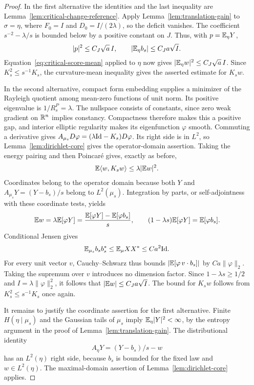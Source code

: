 \begin{proof}
In the first alternative the identities and the last inequality
are Lemma~\ref{lem:critical-change-reference}. Apply
Lemma~\ref{lem:translation-gain} to $\sigma=\eta$, where
$F_0=I$ and $D_0=I/(2\lambda)$, so the deficit vanishes.
The coefficient $s^{-2}-\lambda/s$ is bounded below by a
positive constant on $J$. Thus, with $p=\mathbb E_\eta Y$,
\[
 |p|^2\le C_J\sqrt a\,I,
 \qquad |\mathbb E_\eta b_s|\le C_Ja\sqrt I.
\]
Equation~\eqref{eq:critical-score-mean} applied to $\eta$ now
gives $|\mathbb E_\eta w|^2\le C_J\sqrt a\,I$.
Since $K_s^2\le s^{-1}K_s$, the curvature-mean inequality
gives the asserted estimate for $K_sw$.

In the second alternative, compact form embedding supplies a
minimizer of the Rayleigh quotient among mean-zero functions of
unit norm. Its positive eigenvalue is $1/R_s^P=\lambda$.
The nullspace consists of constants, since zero weak gradient on
$\mathbb R^n$ implies constancy. Compactness therefore makes this a
positive gap, and interior elliptic regularity makes its
eigenfunction $\varphi$ smooth. Commuting a derivative gives
$A_{\mu_s}D\varphi=(\lambda\mathrm{Id}-K_s)D\varphi$.
Its right side is in $L^2$, so
Lemma~\ref{lem:dirichlet-core} gives the operator-domain assertion.
Taking the energy pairing and then Poincar\'e gives, exactly as
before,
\[
 \mathbb E\langle w,K_sw\rangle\le\lambda|\mathbb E w|^2.
\]
Coordinates belong to the operator domain because both $Y$ and
$A_{\mu_s}Y=(Y-b_s)/s$ belong to $L^2(\mu_s)$. Integration
by parts, or self-adjointness with these coordinate tests, yields
\[
 \mathbb E w=\lambda\mathbb E[\varphi Y]
      =\frac{\mathbb E[\varphi Y]-\mathbb E[\varphi b_s]}s,
 \qquad
 (1-\lambda s)\mathbb E[\varphi Y]=\mathbb E[\varphi b_s].
\]
Conditional Jensen gives
\[
 \mathbb E_{\mu_s}b_sb_s^*\le\mathbb E_\mu XX^*\le Ca^2\mathrm{Id}.
\]
For every unit vector $v$, Cauchy--Schwarz thus bounds
$|\mathbb E[\varphi\,v\cdot b_s]|$ by $Ca\|\varphi\|_2$.
Taking the supremum over $v$ introduces no dimension factor.
Since $1-\lambda s\ge1/2$ and
$I=\lambda\|\varphi\|_2^2$, it follows that
$|\mathbb E w|\le C_Ja\sqrt I$. The bound for $K_sw$ follows
from $K_s^2\le s^{-1}K_s$ once again.

It remains to justify the coordinate assertion for the first
alternative. Finite $H(\eta\mid\mu_s)$ and the Gaussian
tails of $\mu_s$ imply $\mathbb E_\eta|Y|^2<\infty$, by the
entropy argument in the proof of Lemma~\ref{lem:translation-gain}.
The distributional identity
\begin{equation}\label{eq:critical-coordinate-generator}
 A_\eta Y=(Y-b_s)/s-w
\end{equation}
has an $L^2(\eta)$ right side, because $b_s$ is bounded for
the fixed law and $w\in L^2(\eta)$. The maximal-domain
assertion of Lemma~\ref{lem:dirichlet-core} applies.
\end{proof}

